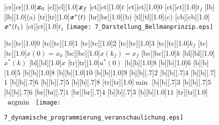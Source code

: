 	
\begin{figure}[h]
	[cr][cr][1.0]{$\boldsymbol{x}_0$}
	[cl][cl][1.0]{$\boldsymbol{x}_f$}
	[ct][ct][1.0]{$t$}
	[ct][ct][1.0]{$0$}
	[ct][ct][1.0]{$t_f$}
	[lb][lb][1.0]{(a)}
	[tr][tr][1.0]{$\boldsymbol{x}^\ast(t)$}
	[br][br][1.0]{(b)}
	[tl][tl][1.0]{(c)}
	[cb][cb][1.0]{$\boldsymbol{x}^\ast(t_1)$}
	[ct][ct][1.0]{$t_1$}
	\centering
 \texttt{[image: 7\_Darstellung\_Bellmanprinzip.eps]}
	\label{fig:Darstellung_Bellmanprinzip}
\end{figure} 

\begin{figure}[h]
	[tc][tc][1.0]{0}
	[tc][tc][1.0]{1}
	[tc][tc][1.0]{2}
	[tc][tc][1.0]{3}
	[tc][tc][1.0]{$k_f$}
	[tc][tc][1.0]{$x(0) = x_0$}
	[bc][bc][1.0]{$x(k_f) = x_f$}
	[bc][bc][1.0]{$k$}
	[bl][bl][1.0]{$x^\ast(k)$}
	[bl][bl][1.0]{$x$}
	[tr][tr][1.0]{$u^\ast(0)$}
	[b][1.0]{$8$}
	[b][1.0]{$6$}
	[b][1.0]{$5$}
	[b][1.0]{$8$}
	[b][1.0]{$10$}
	[b][1.0]{$9$}
	[b][.7]{$2$}
	[b][.7]{$4$}
	[b][.7]{$1$}
	[b][.7]{$6$}
	[b][.7]{$5$}
	[b][.7]{$8$}
	[tr][tr][1.0]{$\min$}
	[b][.7]{$3$}
	[b][.7]{$5$}
	[b][.7]{$6$}
	[br][br][.7]{$1$}
	[br][br][.7]{$4$}
	[b][.7]{$3$}
	[b][1.0]{$11$}
	[tr][tr][1.0]{$\argmin{}$}
	\centering
  	\texttt{[image: 7\_dynamische\_programmierung\_veranschaulichung.eps]}
	\label{fig:dynamische_programmierung_veranschaulichung}
\end{figure} 

